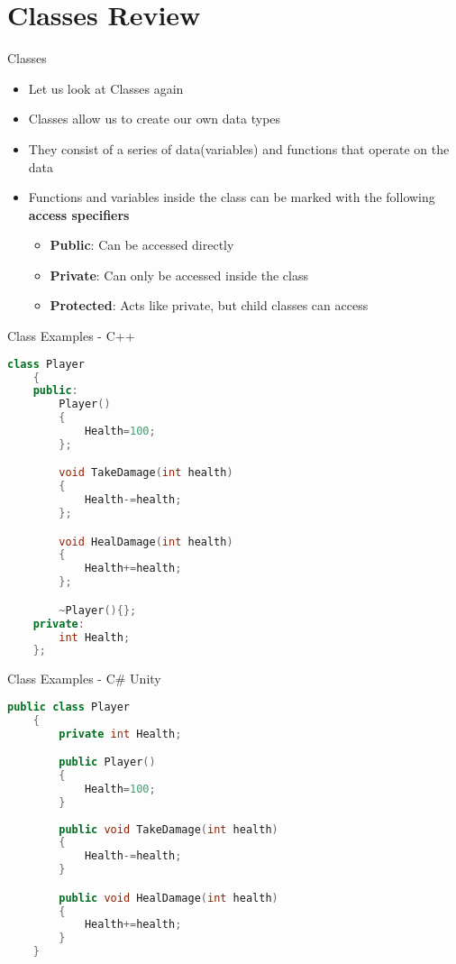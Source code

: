 \part{Classes Review}
\frame{\partpage}

\begin{frame}{Classes}
	\begin{itemize}
		\pause \item Let us look at Classes again
		\pause \item Classes allow us to create our own data types
		\pause \item They consist of a series of data(variables) and functions that operate on the data
		\pause \item Functions and variables inside the class can be marked with the following \textbf{access specifiers}
		\begin{itemize}
			\pause \item \textbf{Public}: Can be accessed directly
			\pause \item \textbf{Private}: Can only be accessed inside the class
			\pause \item \textbf{Protected}: Acts like private, but child classes can access
		\end{itemize}
	\end{itemize}
\end{frame}

\begin{frame}[fragile]{Class Examples - C++}
	\begin{lstlisting}[language=C++,basicstyle=\tiny,]
	class Player
	{
	public:
		Player()
		{
			Health=100;
		};

		void TakeDamage(int health)
		{
			Health-=health;
		};

		void HealDamage(int health)
		{
			Health+=health;
		};

		~Player(){};
	private:
		int Health;
	};
\end{lstlisting}
\end{frame}

\begin{frame}[fragile]{Class Examples - C\# Unity}
\begin{lstlisting}[language=C++,basicstyle=\tiny,]
	public class Player
	{
		private int Health;

		public Player()
		{
			Health=100;
		}
		
		public void TakeDamage(int health)
		{
			Health-=health;
		}

		public void HealDamage(int health)
		{
			Health+=health;
		}
	}
\end{lstlisting}
\end{frame}

